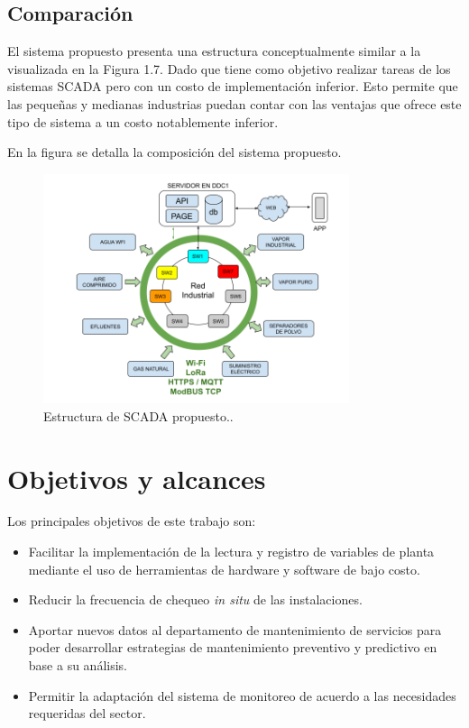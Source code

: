  
 \subsection{Comparación}

El sistema propuesto presenta una estructura conceptualmente similar a la visualizada en la Figura 1.7. Dado que tiene como objetivo realizar tareas de los sistemas SCADA pero con un costo de implementación inferior. Esto permite que las pequeñas y medianas industrias puedan contar con las ventajas que ofrece este tipo de sistema a un costo notablemente inferior.

En la figura se detalla la composición del sistema propuesto.

\begin{figure}[htbp]
	\centering
	\includegraphics[width=0.8\textwidth]{./Figures/RED.png}
	\caption{Estructura de SCADA propuesto.\protect\footnotemark.}
	\label{fig:SCPROY}
\end{figure}


\section{Objetivos y alcances}


Los principales objetivos de este trabajo son:
\begin{itemize}
	\item Facilitar la implementación de la lectura y registro de variables de planta mediante el uso de herramientas de hardware y software de bajo costo. 
	\item Reducir la frecuencia de chequeo \textit{in situ} de las instalaciones.
	\item Aportar nuevos datos al departamento de mantenimiento de servicios para poder desarrollar estrategias de mantenimiento preventivo y predictivo en base a su análisis.
	\item Permitir la adaptación del sistema de monitoreo de acuerdo a las necesidades requeridas del sector.
\end{itemize}

